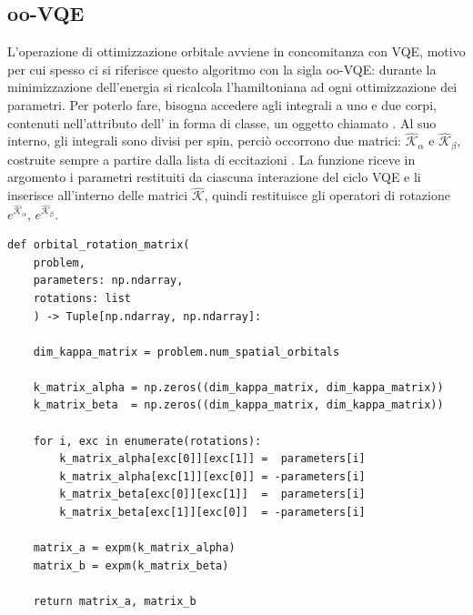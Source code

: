 \subsection{oo-VQE}\label{sez:oo-VQE}

L'operazione di ottimizzazione orbitale avviene in concomitanza con VQE, motivo per cui spesso ci si riferisce questo algoritmo con la sigla oo-VQE: durante la minimizzazione dell'energia si ricalcola l'hamiltoniana ad ogni ottimizzazione dei parametri. Per poterlo fare, bisogna accedere agli integrali a uno e due corpi, contenuti nell'attributo  dell' in forma di classe, un oggetto chiamato . Al suo interno, gli integrali sono divisi per spin, perciò occorrono due matrici: $\hat{\mathcal{K}}_\alpha$ e $\hat{\mathcal{K}}_\beta$, costruite sempre a partire dalla lista di eccitazioni . 
La funzione  riceve in argomento i parametri restituiti da ciascuna interazione del ciclo VQE e li inserisce all'interno delle matrici $\hat{\mathcal{K}}$, quindi restituisce gli operatori di rotazione $e^{\hat{\mathcal{K}}_\alpha}$, $e^{\hat{\mathcal{K}}_\beta}$.

\begin{tcolorbox}[title=Costruzione $e^{\hat{\mathcal{K}}}$, breakable]
\begin{lstlisting}
def orbital_rotation_matrix(
    problem, 
    parameters: np.ndarray, 
    rotations: list
    ) -> Tuple[np.ndarray, np.ndarray]:

    dim_kappa_matrix = problem.num_spatial_orbitals
    
    k_matrix_alpha = np.zeros((dim_kappa_matrix, dim_kappa_matrix))
    k_matrix_beta  = np.zeros((dim_kappa_matrix, dim_kappa_matrix))
    
    for i, exc in enumerate(rotations):
        k_matrix_alpha[exc[0]][exc[1]] =  parameters[i]
        k_matrix_alpha[exc[1]][exc[0]] = -parameters[i]
        k_matrix_beta[exc[0]][exc[1]]  =  parameters[i]
        k_matrix_beta[exc[1]][exc[0]]  = -parameters[i]

    matrix_a = expm(k_matrix_alpha)
    matrix_b = expm(k_matrix_beta)
    
    return matrix_a, matrix_b
\end{lstlisting}
\vspace{-0.2cm}
\end{tcolorbox}

